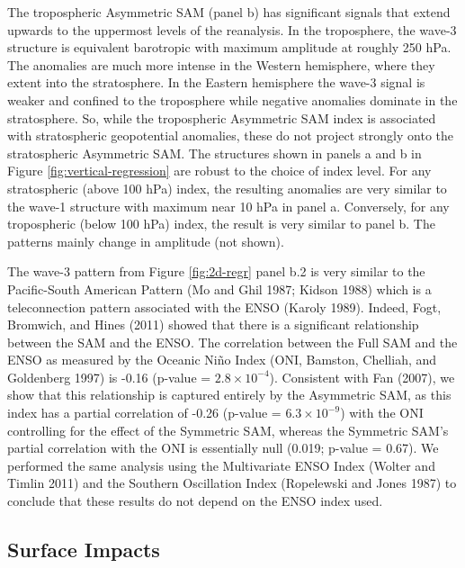 \documentclass[smallextended]{svjour3}       %
\begin{document}
The tropospheric Asymmetric SAM (panel b) has significant signals that extend upwards to the uppermost levels of the reanalysis. In the troposphere, the wave-3 structure is equivalent barotropic with maximum amplitude at roughly 250 hPa. The anomalies are much more intense in the Western hemisphere, where they extent into the stratosphere. In the Eastern hemisphere the wave-3 signal is weaker and confined to the troposphere while negative anomalies dominate in the stratosphere. So, while the tropospheric Asymmetric SAM index is associated with stratospheric geopotential anomalies, these do not project strongly onto the stratospheric Asymmetric SAM. The structures shown in panels a and b in Figure \ref{fig:vertical-regression} are robust to the choice of index level. For any stratospheric (above 100 hPa) index, the resulting anomalies are very similar to the wave-1 structure with maximum near 10 hPa in panel a. Conversely, for any tropospheric (below 100 hPa) index, the result is very similar to panel b. The patterns mainly change in amplitude (not shown).

The wave-3 pattern from Figure \ref{fig:2d-regr} panel b.2 is very similar to the Pacific-South American Pattern (Mo and Ghil 1987; Kidson 1988) which is a teleconnection pattern associated with the ENSO (Karoly 1989). Indeed, Fogt, Bromwich, and Hines (2011) showed that there is a significant relationship between the SAM and the ENSO. The correlation between the Full SAM and the ENSO as measured by the Oceanic Niño Index (ONI, Bamston, Chelliah, and Goldenberg 1997) is -0.16 (p-value = \ensuremath{2.8\times 10^{-4}}). Consistent with Fan (2007), we show that this relationship is captured entirely by the Asymmetric SAM, as this index has a partial correlation of -0.26 (p-value = \ensuremath{6.3\times 10^{-9}}) with the ONI controlling for the effect of the Symmetric SAM, whereas the Symmetric SAM's partial correlation with the ONI is essentially null (0.019; p-value = 0.67). We performed the same analysis using the Multivariate ENSO Index (Wolter and Timlin 2011) and the Southern Oscillation Index (Ropelewski and Jones 1987) to conclude that these results do not depend on the ENSO index used.

\hypertarget{impacts}{%
\subsection{Surface Impacts}\label{impacts}}
\end{document}
